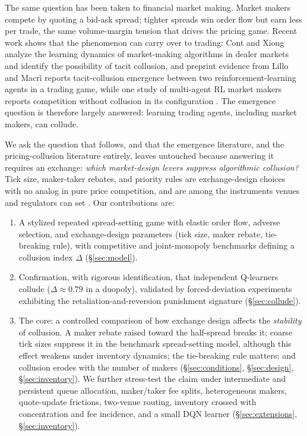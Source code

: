 \documentclass[sigconf]{acmart}
\begin{document}
The same question has been taken to financial market making. Market makers compete by quoting a bid-ask spread; tighter spreads win order flow but earn less per trade, the same volume-margin tension that drives the pricing game. Recent work shows that the phenomenon can carry over to trading: Cont and Xiong \cite{cont2024} analyze the learning dynamics of market-making algorithms in dealer markets and identify the possibility of tacit collusion, and preprint evidence from Lillo and Macr\`i \cite{macri2024} reports tacit-collusion emergence between two reinforcement-learning agents in a trading game, while one study of multi-agent RL market makers reports competition without collusion in its configuration \cite{wang2025}. The emergence question is therefore largely answered: learning trading agents, including market makers, can collude.

We ask the question that follows, and that the emergence literature, and the pricing-collusion literature entirely, leaves untouched because answering it requires an exchange: \emph{which market-design levers suppress algorithmic collusion?} Tick size, maker-taker rebates, and priority rules are exchange-design choices with no analog in pure price competition, and are among the instruments venues and regulators can set \cite{harris1994,colliard2012,battalio2016,glosten1994}. Our contributions are:
\begin{enumerate}[leftmargin=*]
\item A stylized repeated spread-setting game with elastic order flow, adverse selection, and exchange-design parameters (tick size, maker rebate, tie-breaking rule), with competitive and joint-monopoly benchmarks defining a collusion index $\Delta$ (\S\ref{sec:model}).
\item Confirmation, with rigorous identification, that independent Q-learners collude ($\Delta \approx 0.79$ in a duopoly), validated by forced-deviation experiments exhibiting the retaliation-and-reversion punishment signature (\S\ref{sec:collude}).
\item The core: a controlled comparison of how exchange design affects the \emph{stability} of collusion. A maker rebate raised toward the half-spread breaks it; coarse tick sizes suppress it in the benchmark spread-setting model, although this effect weakens under inventory dynamics; the tie-breaking rule matters; and collusion erodes with the number of makers (\S\ref{sec:conditions}, \S\ref{sec:design}, \S\ref{sec:inventory}). We further stress-test the claim under intermediate and persistent queue allocation, maker/taker fee splits, heterogeneous makers, quote-update frictions, two-venue routing, inventory crossed with concentration and fee incidence, and a small DQN learner (\S\ref{sec:extensions}, \S\ref{sec:inventory}).
\end{enumerate}
\end{document}
